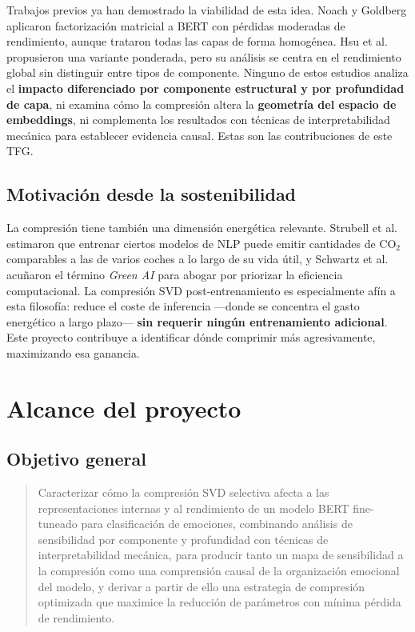 \documentclass[11pt, a4paper]{article}
\begin{document}
Trabajos previos ya han demostrado la viabilidad de esta idea. Noach y Goldberg \cite{noach2020compressing} aplicaron factorización matricial a BERT con pérdidas moderadas de rendimiento, aunque trataron todas las capas de forma homogénea. Hsu et al.\ \cite{hsu2022language} propusieron una variante ponderada, pero su análisis se centra en el rendimiento global sin distinguir entre tipos de componente. Ninguno de estos estudios analiza el \textbf{impacto diferenciado por componente estructural y por profundidad de capa}, ni examina cómo la compresión altera la \textbf{geometría del espacio de embeddings}, ni complementa los resultados con técnicas de interpretabilidad mecánica para establecer evidencia causal. Estas son las contribuciones de este TFG.

\subsection{Motivación desde la sostenibilidad}

La compresión tiene también una dimensión energética relevante. Strubell et al.\ \cite{strubell2019energy} estimaron que entrenar ciertos modelos de NLP puede emitir cantidades de CO$_2$ comparables a las de varios coches a lo largo de su vida útil, y Schwartz et al.\ \cite{schwartz2020green} acuñaron el término \textit{Green AI} para abogar por priorizar la eficiencia computacional. La compresión SVD post-entrenamiento es especialmente afín a esta filosofía: reduce el coste de inferencia ---donde se concentra el gasto energético a largo plazo--- \textbf{sin requerir ningún entrenamiento adicional}. Este proyecto contribuye a identificar dónde comprimir más agresivamente, maximizando esa ganancia.

\section{Alcance del proyecto}
\label{sec:alcance}

\subsection{Objetivo general}

\begin{quote}
    Caracterizar cómo la compresión SVD selectiva afecta a las representaciones internas y al rendimiento de un modelo BERT fine-tuneado para clasificación de emociones, combinando análisis de sensibilidad por componente y profundidad con técnicas de interpretabilidad mecánica, para producir tanto un mapa de sensibilidad a la compresión como una comprensión causal de la organización emocional del modelo, y derivar a partir de ello una estrategia de compresión optimizada que maximice la reducción de parámetros con mínima pérdida de rendimiento.
\end{quote}
\end{document}
